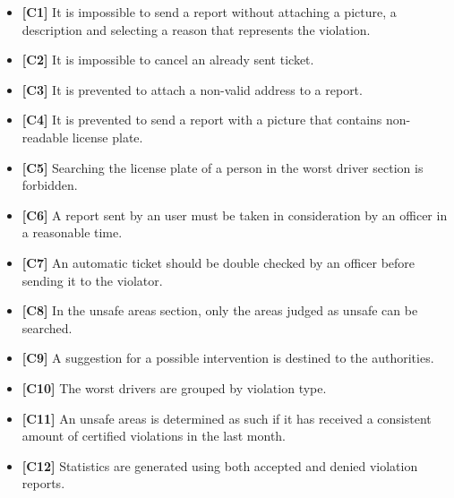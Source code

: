 \begin{itemize}
		\item \textbf{[\hypertarget{C1}{C1}]} It is impossible to send a report without attaching a picture, a description and selecting a reason that represents the violation. 
		\item \textbf{[\hypertarget{C2}{C2}]} It is impossible to cancel an already sent ticket. 
		\item \textbf{[\hypertarget{C3}{C3}]} It is prevented to attach a non-valid address to a report.
		\item \textbf{[\hypertarget{C4}{C4}]} It is prevented to send a report with a picture that contains non-readable license plate. 
		\item \textbf{[\hypertarget{C5}{C5}]} Searching the license plate of a person in the worst driver section is forbidden.
		\item \textbf{[\hypertarget{C6}{C6}]} A report sent by an user must be taken in consideration by an officer in a reasonable time.
		\item \textbf{[\hypertarget{C7}{C7}]} An automatic ticket should be double checked by an officer before sending it to the violator.
		\item \textbf{[\hypertarget{C8}{C8}]} In the unsafe areas section, only the areas judged as unsafe can be searched.
		\item \textbf{[\hypertarget{C9}{C9}]} A suggestion for a possible intervention is destined to the authorities.
		\item \textbf{[\hypertarget{C10}{C10}]} The worst drivers are grouped by violation type.
		\item \textbf{[\hypertarget{C11}{C11}]} An unsafe areas is determined as such if it has received a consistent amount of certified violations in the last month. 
		\item \textbf{[\hypertarget{C12}{C12}]} Statistics are generated using both accepted and denied violation reports.
		
		
	\end{itemize}
\clearpage
